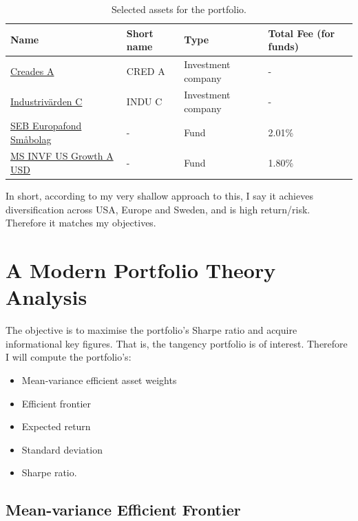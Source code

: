 \documentclass[a4paper]{article}
\begin{document}
\begin{table}[H]
    \label{table_assets}
    \begin{center}
    \begin{tabular}{ |l|l|l|l| }
        \hline
        Name & Short name & Type & Total Fee (for funds) \\
        \hline
        \href{https://www.avanza.se/aktier/om-aktien.html/338588/creades-a}{Creades A} & CRED A & Investment company & - \\
        \href{https://www.avanza.se/aktier/om-aktien.html/5245/industrivarden-c}{Industrivärden C} & INDU C & Investment company & - \\
        \href{https://www.avanza.se/fonder/om-fonden.html/929/seb-europafond-smabolag}{SEB Europafond Småbolag} & - & Fund & 2.01\% \\
        \href{https://www.avanza.se/fonder/om-fonden.html/70331/ms-invf-us-growth-a-usd}{MS INVF US Growth A USD} & - & Fund & 1.80\% \\
        \hline
    \end{tabular}
    \end{center}
    \caption{Selected assets for the portfolio.}
\end{table}

In short, according to my very shallow approach to this, I say it achieves diversification across USA, Europe and Sweden, and is high return/risk. Therefore it matches my objectives.

\section{A Modern Portfolio Theory Analysis}

The objective is to maximise the portfolio's Sharpe ratio and acquire informational key figures. That is, the tangency portfolio is of interest. Therefore I will compute the portfolio's:

\begin{itemize}
    \item Mean-variance efficient asset weights
    \item Efficient frontier
    \item Expected return
    \item Standard deviation
    \item Sharpe ratio.
\end{itemize}

\subsection{Mean-variance Efficient Frontier}
\end{document}
